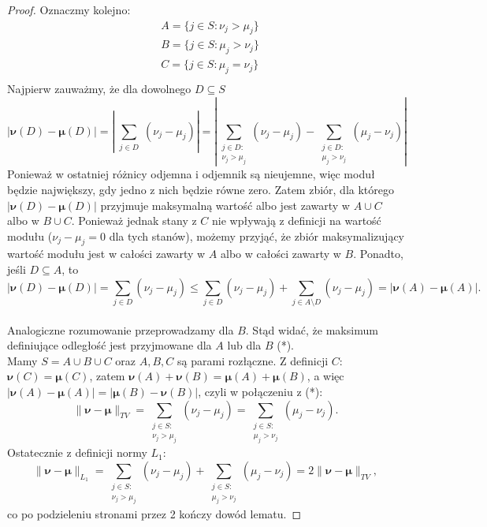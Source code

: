 \documentclass[a4paper]{article}
\theoremstyle{defn}
\theoremstyle{theorem}
\theoremstyle{lemma}
\theoremstyle{cor}
\theoremstyle{fact}
\begin{document}
\begin{proof}
Oznaczmy kolejno: \begin{align*}
&A = \{j \in S: \nu_j > \mu_j\}\\
&B = \{j \in S: \mu_j > \nu_j\}\\
&C = \{j \in S: \mu_j = \nu_j\}\\
\end{align*}
Najpierw zauważmy, że dla dowolnego $D \subseteq S$ $$|\boldsymbol{\nu}(D) - \boldsymbol{\mu}(D)| =  \left\lvert \sum\limits_{\substack{j \in D}} (\nu_j - \mu_j) \right\rvert =  \left\lvert \sum\limits_{\substack{j \in D:\\ \nu_j > \mu_j}} (\nu_j - \mu_j) - \sum\limits_{\substack{j \in D:\\ \mu_j > \nu_j}} (\mu_j - \nu_j) \right\rvert$$
Ponieważ w ostatniej różnicy odjemna i odjemnik są nieujemne, więc moduł będzie największy, gdy jedno z nich będzie równe zero. Zatem zbiór, dla którego $|\boldsymbol{\nu}(D) - \boldsymbol{\mu}(D)|$ przyjmuje maksymalną wartość albo jest zawarty w $A \cup C$ albo w $B \cup C$. Ponieważ jednak stany z $C$ nie wpływają z definicji na wartość modułu ($\nu_j - \mu_j = 0$ dla tych stanów), możemy przyjąć, że zbiór maksymalizujący wartość modułu jest w całości zawarty w $A$ albo w całości zawarty w $B$. Ponadto, jeśli $D \subseteq A$, to
$$|\boldsymbol{\nu}(D) - \boldsymbol{\mu}(D)| = \sum\limits_{j \in D} (\nu_j - \mu_j) \leq \sum\limits_{j \in D} (\nu_j - \mu_j) + \sum\limits_{j \in A \setminus D} (\nu_j - \mu_j) = |\boldsymbol{\nu}(A) - \boldsymbol{\mu}(A)|.$$\\
Analogiczne rozumowanie przeprowadzamy dla $B$. Stąd widać, że maksimum definiujące odległość jest przyjmowane dla $A$ lub dla $B$ (*). \\
Mamy $S = A \cup B \cup C$ oraz $A, B, C$ są parami rozłączne. Z definicji $C$: $\boldsymbol{\nu}(C) = \boldsymbol{\mu}(C)$, zatem $\boldsymbol{\nu}(A) + \boldsymbol{\nu}(B) = \boldsymbol{\mu}(A) + \boldsymbol{\mu}(B)$, a więc $|\boldsymbol{\nu}(A) - \boldsymbol{\mu}(A)| = |\boldsymbol{\mu}(B) - \boldsymbol{\nu}(B)|$, czyli w połączeniu z (*):
$$\|\boldsymbol{\nu} - \boldsymbol{\mu}\|_{TV} = \sum\limits_{\substack{j \in S:\\ \nu_j > \mu_j}} (\nu_j - \mu_j) = \sum\limits_{\substack{j \in S:\\ \mu_j > \nu_j}} (\mu_j - \nu_j).$$
Ostatecznie z definicji normy $L_1$:
$$\|\boldsymbol{\nu} - \boldsymbol{\mu}\|_{L_1} = \sum\limits_{\substack{j \in S:\\ \nu_j > \mu_j}} (\nu_j - \mu_j) + \sum\limits_{\substack{j \in S:\\ \mu_j > \nu_j}} (\mu_j - \nu_j) = 2\|\boldsymbol{\nu} - \boldsymbol{\mu}\|_{TV},$$
co po podzieleniu stronami przez 2 kończy dowód lematu.
\end{proof}
\end{document}
